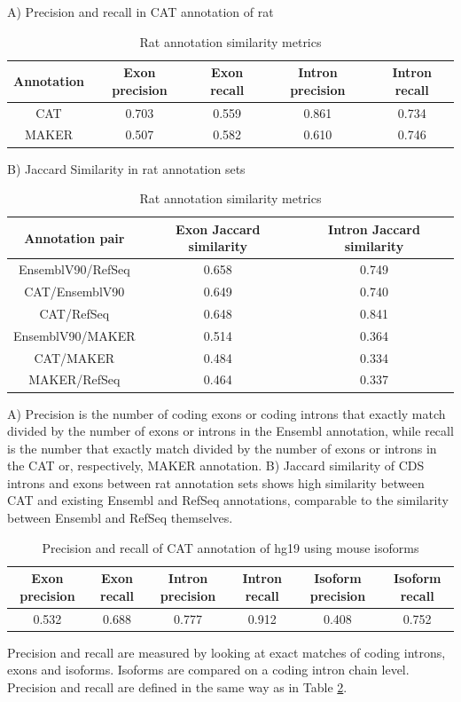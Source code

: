 \begin{table}
\centering
A) Precision and recall in CAT annotation of rat\\
\begin{tabular}{|c|c|c|c|c|} \hline
Annotation & Exon precision & Exon recall & Intron precision & Intron recall \\ \hline
CAT & 0.703 & 0.559 & 0.861 & 0.734 \\ \hline
MAKER & 0.507 & 0.582 & 0.610 & 0.746 \\ \hline
\end{tabular}

\vspace{5mm}
B) Jaccard Similarity in rat annotation sets \\
\begin{tabular}{|c|c|c|} \hline
Annotation pair & Exon Jaccard similarity & Intron Jaccard similarity \\ \hline
EnsemblV90/RefSeq & 0.658 & 0.749 \\ \hline
CAT/EnsemblV90 & 0.649 & 0.740 \\ \hline
CAT/RefSeq & 0.648 & 0.841 \\ \hline
EnsemblV90/MAKER & 0.514 & 0.364 \\ \hline
CAT/MAKER & 0.484 & 0.334 \\ \hline
MAKER/RefSeq & 0.464 & 0.337 \\ \hline
\end{tabular}
\caption{Rat annotation similarity metrics}
A) Precision is the number of coding exons or coding introns that exactly match divided by the number of exons or introns in the Ensembl annotation, while recall is the number that exactly match divided by the number of exons or introns in the CAT or, respectively, MAKER annotation. B) Jaccard similarity of CDS introns and exons between rat annotation sets shows high similarity between CAT and existing Ensembl and RefSeq annotations, comparable to the similarity between Ensembl and RefSeq themselves.
\label{table:rat_similarity}
\end{table}

\begin{table}
\centering
\begin{tabular}{|c|c|c|c|c|c|} \hline
Exon precision & Exon recall & Intron precision & Intron recall & Isoform precision & Isoform recall \\ \hline
0.532 & 0.688 & 0.777 & 0.912 & 0.408 & 0.752 \\ \hline
\end{tabular}
\vspace{5mm}

\caption{Precision and recall of CAT annotation of hg19 using mouse isoforms}
Precision and recall are measured by looking at exact matches of coding introns, exons and isoforms. Isoforms are compared on a coding intron chain level. Precision and recall are defined in the same way as in Table \ref{table:rat_similarity}.
\label{table:validation}
\end{table}

\null\newpage